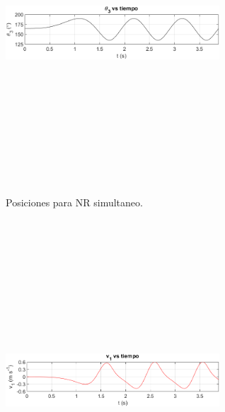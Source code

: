 \documentclass[12pt]{article}
\begin{document}
\begin{multicols}{2}
\begin{figure} [H]
    \end{figure}
        \vspace{-25pt}
        \begin{figure} [H]
        \centerline{\includegraphics[width=8cm, height=12cm,keepaspectratio]{NR Simultaneo/theta3.png}}
        \caption{Posiciones para NR simultaneo.}
        \label{}
    \end{figure}
\begin{figure} [H]
        \centerline{\includegraphics[width=8cm, height=12cm,keepaspectratio]{NR Simultaneo/v1.png}}

\end{figure}
\end{multicols}
\end{document}

